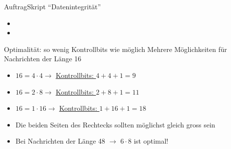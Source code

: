 \begin{frame}{Auftrag}{Skript \enquote{Datenintegrität}}
    \begin{itemize}
        \item {}
        \item {}
    \end{itemize}
\end{frame}

\begin{frame}{Optimalität: so wenig Kontrollbits wie möglich}
    Mehrere Möglichkeiten für Nachrichten der Länge 16
    \begin{itemize}[<+->]
        \item $16 = 4 \cdot 4 \rightarrow$ \underline{Kontrollbits: $4 + 4 + 1 = 9$}
        \item $16 = 2 \cdot 8 \rightarrow$ \underline{Kontrollbits: $2 + 8 + 1 = 11$}
        \item $16 = 1 \cdot 16 \rightarrow$ \underline{Kontrollbits: $1 + 16 + 1 = 18$}
        \item Die beiden Seiten des Rechtecks sollten möglichst gleich gross sein
        \item Bei Nachrichten der Länge 48 $\rightarrow$ $6 \cdot 8$ ist optimal!
    \end{itemize}
\end{frame}
